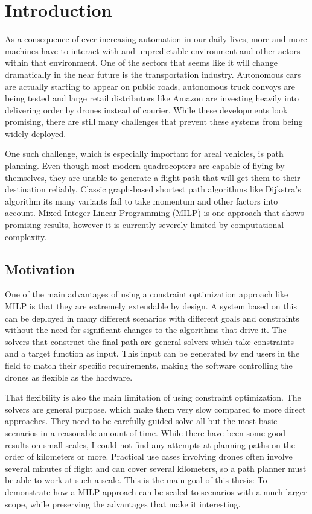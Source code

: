 \chapter{Introduction}
As a consequence of ever-increasing automation in our daily lives, more and more machines have to interact with and unpredictable environment and other actors within that environment. One of the sectors that seems like it will change dramatically in the near future is the transportation industry. Autonomous cars are actually starting to appear on public roads, autonomous truck convoys are being tested and large retail distributors like Amazon are investing heavily into delivering order by drones instead of courier. While these developments look promising, there are still many challenges that prevent these systems from being widely deployed.
\par
One such challenge, which is especially important for areal vehicles, is path planning. Even though most modern quadrocopters are capable of flying by themselves, they are unable to generate a flight path that will get them to their destination reliably. Classic graph-based shortest path algorithms like Dijkstra's algorithm its many variants fail to take momentum and other factors into account. Mixed Integer Linear Programming (MILP) is one approach that shows promising results, however it is currently severely limited by computational complexity.



\section{Motivation }
One of the main advantages of using a constraint optimization approach like MILP is that they are extremely extendable by design. A system based on this can be deployed in many different scenarios with different goals and constraints without the need for significant changes to the algorithms that drive it. The solvers that construct the final path are general solvers which take constraints and a target function as input. This input can be generated by end users in the field to match their specific requirements, making the software controlling the drones as flexible as the hardware.
\par
That flexibility is also the main limitation of using constraint optimization. The solvers are general purpose, which make them very slow compared to more direct approaches. They need to be carefully guided solve all but the most basic scenarios in a reasonable amount of time. While there have been some good results on small scales, I could not find any attempts at planning paths on the order of kilometers or more. Practical use cases involving drones often involve several minutes of flight and can cover several kilometers, so a path planner must be able to work at such a scale. This is the main goal of this thesis: To demonstrate how a MILP approach can be scaled to scenarios with a much larger scope, while preserving the advantages that make it interesting.
